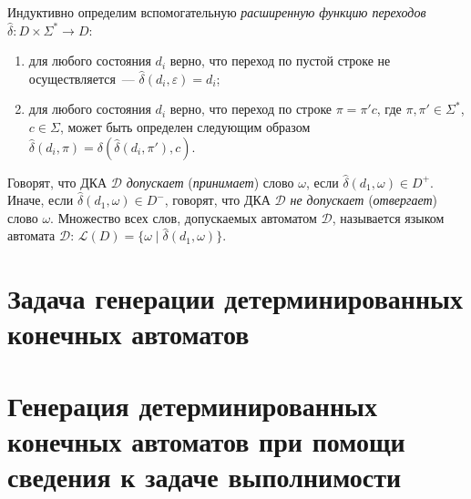 Индуктивно определим вспомогательную \emph{расширенную функцию переходов} $\hat{\delta}: D \times \Sigma^{*} \rightarrow D$:
\begin{enumerate}
  \item для любого состояния $d_{i}$ верно, что переход по пустой строке не осуществляется~{---} $\hat{\delta}\left(d_{i},\varepsilon\right) = d_{i}$;
  \item для любого состояния $d_{i}$ верно, что переход по строке $\pi = \pi'c$, где $\pi,\pi' \in \Sigma^{*}$, $c \in \Sigma$, может быть определен следующим образом $\hat{\delta}\left(d_{i}, \pi\right) = \delta\left(\hat{\delta}\left(d_{i}, \pi'\right), c\right)$.
\end{enumerate}
Говорят, что ДКА $\mathcal{D}$ \emph{допускает} (\emph{принимает}) слово $\omega$, если $\hat{\delta}\left(d_{1}, \omega\right) \in D^{+}$. 
Иначе, если $\hat{\delta}\left(d_{1}, \omega\right) \in D^{-}$, говорят, что ДКА $\mathcal{D}$ \emph{не допускает} (\emph{отвергает}) слово $\omega$. 
Множество всех слов, допускаемых автоматом $\mathcal{D}$, называется языком автомата $\mathcal{D}$: $\mathcal{L}\left(D\right) = \{\omega \mid \hat{\delta}\left(d_{1}, \omega \right)\}$.



\section{Задача генерации детерминированных конечных автоматов} 
\label{sec:review:dfa-inf}




\section{Генерация детерминированных конечных автоматов при помощи сведения к задаче выполнимости} 
\label{sec:review:sat-dfa-inf} 


